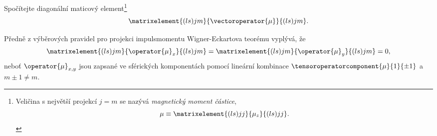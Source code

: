 	Spočítejte diagonální maticový element\footnote{
		Veličina s největší projekcí $j=m$ se nazývá \emph{magnetický moment částice},
		\begin{equation}
			\mu\equiv\matrixelement{(ls)jj}{\mu_{z}}{(ls)jj}.
		\end{equation}
	}
	\begin{equation}
		\matrixelement{(ls)jm}{\vectoroperator{\mu}}{(ls)jm}.
	\end{equation}

\begin{solution}
	Předně z výběrových pravidel pro projekci impulsmomentu Wigner-Eckartova teorému vyplývá, že
	\begin{equation}
		\matrixelement{(ls)jm}{\operator{\mu}_{x}}{(ls)jm}=\matrixelement{(ls)jm}{\operator{\mu}_{y}}{(ls)jm}=0,
	\end{equation}
	neboť $\operator{\mu}_{x,y}$ jsou zapsané ve sférických komponentách pomocí lineární kombinace $\tensoroperatorcomponent{\mu}{1}{\pm1}$
	a $m\pm1\neq m$.


\end{solution}
